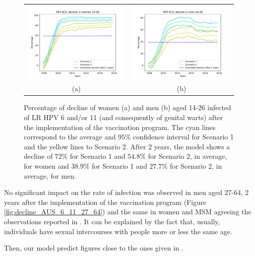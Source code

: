 \begin{figure}[!]
	\centering
	\begin{tabular}{cc}
		\includegraphics[width=0.45\linewidth]{IMGs/3.-Australia/decline_14_26_verr_muj.pdf}	& 
		\includegraphics[width=0.45\linewidth]{IMGs/3.-Australia/decline_14_26_verr_hom.pdf}  \\ 
		(a)	& (b) 
	\end{tabular} 
	\caption{Percentage of decline of women (a) and men (b) aged 14-26 infected of LR HPV 6 and/or 11 (and consequently of genital warts) after the implementation of the vaccination program. The cyan lines correspond to the average and $95\%$ confidence interval for Scenario 1 and the yellow lines to Scenario 2. After 2 years, the model shows a decline of $72\%$ for Scenario 1 and $54.8\%$ for Scenario 2, in average, for women and $38.9\%$ for Scenario 1 and $27.7\%$ for Scenario 2, in average, for men.}
	\label{fig:decline_AUS_6_11}
\end{figure}

No significant impact on the rate of infection was observed in men aged 27-64, 2 years after the implementation of the vaccination program (Figure \ref{fig:decline_AUS_6_11_27_64}) and the same in women and MSM agreeing the observations reported in \cite{ali2013genital}. It can be explained by the fact that, usually, individuals have sexual intercourses with people more or less the same age. 

Then, our model predict figures close to the ones given in \cite{ali2013genital}.

